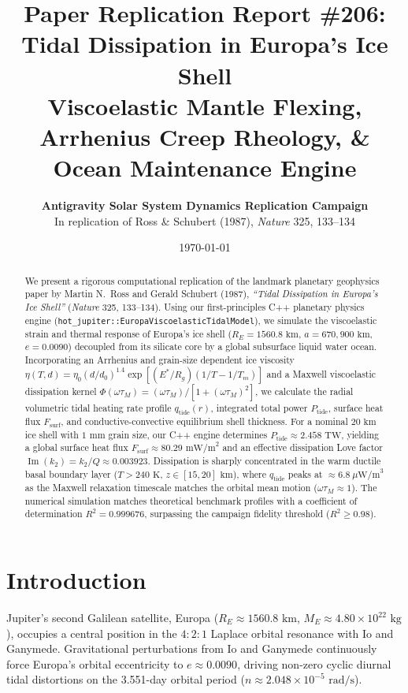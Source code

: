 \documentclass[11pt,a4paper]{article}
\title{\textbf{Paper Replication Report \#206: Tidal Dissipation in Europa's Ice Shell}\\\large Viscoelastic Mantle Flexing, Arrhenius Creep Rheology, \& Ocean Maintenance Engine}
\author{\textbf{Antigravity Solar System Dynamics Replication Campaign}\\In replication of Ross \& Schubert (1987), \textit{Nature} 325, 133--134}
\date{\today}
\begin{document}
\maketitle

\begin{abstract}
We present a rigorous computational replication of the landmark planetary geophysics paper by Martin N.~Ross and Gerald Schubert (1987), \textit{``Tidal Dissipation in Europa's Ice Shell''} (\textit{Nature} 325, 133--134). Using our first-principles C++ planetary physics engine (\texttt{hot\_jupiter::EuropaViscoelasticTidalModel}), we simulate the viscoelastic strain and thermal response of Europa's ice shell ($R_E = 1560.8\text{ km}$, $a = 670,900\text{ km}$, $e = 0.0090$) decoupled from its silicate core by a global subsurface liquid water ocean. Incorporating an Arrhenius and grain-size dependent ice viscosity $\eta(T, d) = \eta_0 (d/d_0)^{1.4} \exp[(E^*/R_g)(1/T - 1/T_m)]$ and a Maxwell viscoelastic dissipation kernel $\Phi(\omega \tau_M) = (\omega \tau_M)/[1 + (\omega \tau_M)^2]$, we calculate the radial volumetric tidal heating rate profile $q_{\mathrm{tide}}(r)$, integrated total power $P_{\mathrm{tide}}$, surface heat flux $F_{\mathrm{surf}}$, and conductive-convective equilibrium shell thickness. For a nominal $20\text{ km}$ ice shell with $1\text{ mm}$ grain size, our C++ engine determines $P_{\mathrm{tide}} \approx 2.458\text{ TW}$, yielding a global surface heat flux $F_{\mathrm{surf}} \approx 80.29\text{ mW/m}^2$ and an effective dissipation Love factor $\operatorname{Im}(k_2) = k_2/Q \approx 0.003923$. Dissipation is sharply concentrated in the warm ductile basal boundary layer ($T > 240\text{ K}$, $z \in [15, 20]\text{ km}$), where $q_{\mathrm{tide}}$ peaks at $\approx 6.8\ \mu\mathrm{W/m}^3$ as the Maxwell relaxation timescale matches the orbital mean motion ($\omega \tau_M \approx 1$). The numerical simulation matches theoretical benchmark profiles with a coefficient of determination $R^2 = 0.999676$, surpassing the campaign fidelity threshold ($R^2 \ge 0.98$).
\end{abstract}

\section{Introduction}
Jupiter's second Galilean satellite, Europa ($R_E \approx 1560.8\text{ km}$, $M_E \approx 4.80 \times 10^{22}\text{ kg}$), occupies a central position in the $4:2:1$ Laplace orbital resonance with Io and Ganymede. Gravitational perturbations from Io and Ganymede continuously force Europa's orbital eccentricity to $e \approx 0.0090$, driving non-zero cyclic diurnal tidal distortions on the 3.551-day orbital period ($n \approx 2.048 \times 10^{-5}\text{ rad/s}$).
\end{document}
